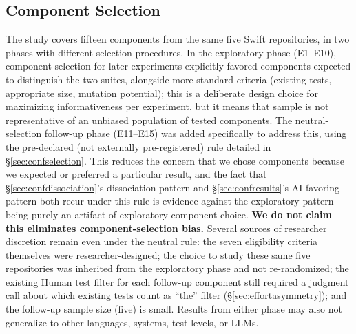 \documentclass[10pt,conference]{IEEEtran}
\begin{document}
\subsection{Component Selection}
\label{sec:threatscomponent}
The study covers fifteen components from the same five Swift repositories, in two phases with different selection procedures. In the exploratory phase (E1--E10), component selection for later experiments explicitly favored components expected to distinguish the two suites, alongside more standard criteria (existing tests, appropriate size, mutation potential); this is a deliberate design choice for maximizing informativeness per experiment, but it means that sample is not representative of an unbiased population of tested components. The neutral-selection follow-up phase (E11--E15) was added specifically to address this, using the pre-declared (not externally pre-registered) rule detailed in \S\ref{sec:confselection}. This reduces the concern that we chose components because we expected or preferred a particular result, and the fact that \S\ref{sec:confdissociation}'s dissociation pattern and \S\ref{sec:confresults}'s AI-favoring pattern both recur under this rule is evidence against the exploratory pattern being purely an artifact of exploratory component choice. \textbf{We do not claim this eliminates component-selection bias.} Several sources of researcher discretion remain even under the neutral rule: the seven eligibility criteria themselves were researcher-designed; the choice to study these same five repositories was inherited from the exploratory phase and not re-randomized; the existing Human test filter for each follow-up component still required a judgment call about which existing tests count as ``the'' filter (\S\ref{sec:effortasymmetry}); and the follow-up sample size (five) is small. Results from either phase may also not generalize to other languages, systems, test levels, or LLMs.
\end{document}
